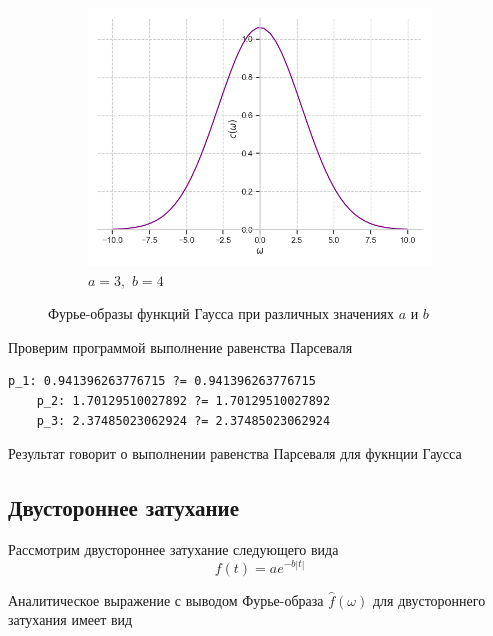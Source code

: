 \documentclass[a4paper, 16pt]{article}
\begin{document}
\begin{figure}[htbp]
\begin{subfigure}{0.3\textwidth}
            \centering
            \includegraphics[width=\linewidth]{gausfimg_a=3_b=4.png}
            \caption{$a=3,\,\,b=4$}
            \label{fig:gausfimg_3}
        \end{subfigure}
        \caption{Фурье-образы функций Гаусса при различных значениях $a$ и $b$}
        \label{fig:gausfimgs}
    \end{figure}




    \noindent Проверим программой выполнение равенства Парсеваля
    \begin{lstlisting}[label=pars_gaus, caption=Равенство Парсеваля для функции Гаусса]
    p_1: 0.941396263776715 ?= 0.941396263776715
    p_2: 1.70129510027892 ?= 1.70129510027892
    p_3: 2.37485023062924 ?= 2.37485023062924
    \end{lstlisting}


    \noindent Результат говорит о выполнении равенства Парсеваля для фукнции Гаусса


    \subsection{Двустороннее затухание}
    \noindent Рассмотрим двустороннее затухание следующего вида
    $$
    f(t)=ae^{-b|t|}
    $$


    \noindent Аналитическое выражение с выводом Фурье-образа
    $\hat{f}(\omega)$ для двустороннего затухания имеет вид
\end{document}
